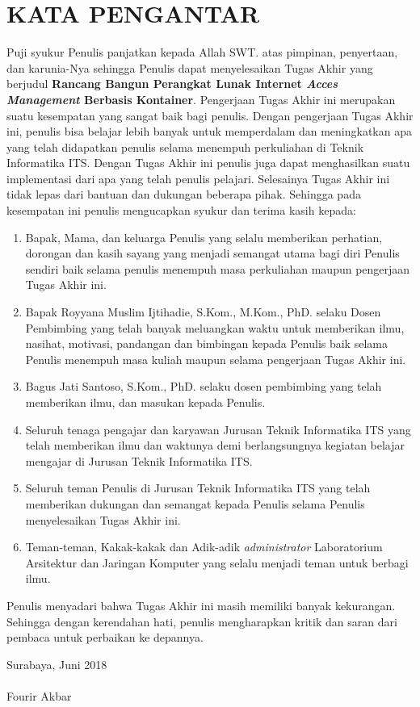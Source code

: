 \chapter{KATA PENGANTAR}
	Puji syukur Penulis panjatkan kepada Allah SWT. atas pimpinan, penyertaan, dan karunia-Nya sehingga Penulis dapat menyelesaikan Tugas Akhir yang berjudul \textbf{Rancang Bangun Perangkat Lunak Internet \textit{Acces Management} Berbasis Kontainer}. Pengerjaan Tugas Akhir ini merupakan suatu kesempatan yang sangat baik bagi penulis. Dengan pengerjaan Tugas Akhir ini, penulis bisa belajar lebih banyak untuk memperdalam dan meningkatkan apa yang telah didapatkan penulis selama menempuh perkuliahan di Teknik Informatika ITS. Dengan Tugas Akhir ini penulis juga dapat menghasilkan suatu implementasi dari apa yang telah penulis pelajari.
        Selesainya Tugas Akhir ini tidak lepas dari bantuan dan dukungan beberapa pihak. Sehingga pada kesempatan ini penulis mengucapkan syukur dan terima kasih kepada:
  \begin{enumerate}
    \item Bapak, Mama, dan keluarga Penulis yang selalu memberikan perhatian, dorongan dan kasih sayang yang menjadi semangat utama bagi diri Penulis sendiri baik selama penulis menempuh masa perkuliahan maupun pengerjaan Tugas Akhir ini.
    \item Bapak Royyana Muslim Ijtihadie, S.Kom., M.Kom., PhD. selaku Dosen Pembimbing yang telah banyak meluangkan waktu untuk memberikan ilmu, nasihat, motivasi, pandangan dan bimbingan kepada Penulis baik selama Penulis menempuh masa kuliah maupun selama pengerjaan Tugas Akhir ini.
    \item Bagus Jati Santoso, S.Kom., PhD. selaku dosen pembimbing yang telah memberikan ilmu, dan masukan kepada Penulis.
    \item Seluruh tenaga pengajar dan karyawan Jurusan Teknik Informatika ITS yang telah memberikan ilmu dan waktunya demi berlangsungnya kegiatan belajar mengajar di Jurusan Teknik Informatika ITS.
    \item Seluruh teman Penulis di Jurusan Teknik Informatika ITS yang telah memberikan dukungan dan semangat kepada Penulis selama Penulis menyelesaikan Tugas Akhir ini.
    \item Teman-teman, Kakak-kakak dan Adik-adik \textit{administrator} Laboratorium Arsitektur dan Jaringan Komputer yang selalu menjadi teman untuk berbagi ilmu.
  \end{enumerate}

  Penulis menyadari bahwa Tugas Akhir ini masih memiliki banyak kekurangan. Sehingga dengan kerendahan hati, penulis mengharapkan kritik dan saran dari pembaca untuk perbaikan ke depannya.


  \hfill Surabaya, Juni 2018 \\ \\ 


  \hfill Fourir Akbar

\cleardoublepage %

